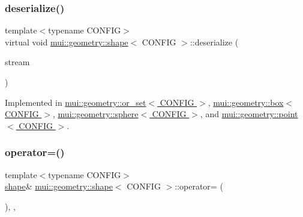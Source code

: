 \mbox{\label{classmui_1_1geometry_1_1shape_ae68c7e1a1ae362abec52edad5489a1a9}} 
\subsubsection{\texorpdfstring{deserialize()}{deserialize()}}
{\footnotesize\ttfamily template$<$typename C\+O\+N\+F\+IG$>$ \\
virtual void \hyperlink{classmui_1_1geometry_1_1shape}{mui\+::geometry\+::shape}$<$ C\+O\+N\+F\+IG $>$\+::deserialize (\begin{DoxyParamCaption}\item[{\hyperlink{classmui_1_1istream}{istream} \&}]{stream }\end{DoxyParamCaption})\hspace{0.3cm}{\ttfamily [pure virtual]}}



Implemented in \hyperlink{classmui_1_1geometry_1_1or__set_ad08aaf634078ee8407ab86de77576391}{mui\+::geometry\+::or\+\_\+set$<$ C\+O\+N\+F\+I\+G $>$}, \hyperlink{classmui_1_1geometry_1_1box_a35467a9cfe92d36b2b232b796f7959e7}{mui\+::geometry\+::box$<$ C\+O\+N\+F\+I\+G $>$}, \hyperlink{classmui_1_1geometry_1_1sphere_a6b9d913f4d05b03f2dd07f48387e0c77}{mui\+::geometry\+::sphere$<$ C\+O\+N\+F\+I\+G $>$}, and \hyperlink{classmui_1_1geometry_1_1point_ad51109c7b96af086ac9a7cb5422a5d2e}{mui\+::geometry\+::point$<$ C\+O\+N\+F\+I\+G $>$}.

\mbox{\label{classmui_1_1geometry_1_1shape_a01032c60e8387c88293d1dec04d27299}} 
\subsubsection{\texorpdfstring{operator=()}{operator=()}\hspace{0.1cm}{\footnotesize\ttfamily [1/2]}}
{\footnotesize\ttfamily template$<$typename C\+O\+N\+F\+IG$>$ \\
\hyperlink{classmui_1_1geometry_1_1shape}{shape}\& \hyperlink{classmui_1_1geometry_1_1shape}{mui\+::geometry\+::shape}$<$ C\+O\+N\+F\+IG $>$\+::operator= (\begin{DoxyParamCaption}\item[{\hyperlink{classmui_1_1geometry_1_1shape}{shape}$<$ C\+O\+N\+F\+IG $>$ \&\&}]{ }\end{DoxyParamCaption})\hspace{0.3cm}{\ttfamily [protected]}, {\ttfamily [default]}, {\ttfamily [noexcept]}}

